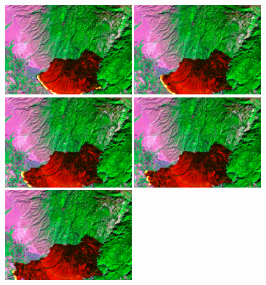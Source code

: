 \documentclass{article}
\begin{document}
    \begin{figure}
        \centering
        \includegraphics[width=0.49\textwidth]{resources/wildfire.overlay.158.png}
        \includegraphics[width=0.49\textwidth]{resources/wildfire.overlay.176.png}\hfill
        \\[\smallskipamount]
        \includegraphics[width=0.49\textwidth]{resources/wildfire.overlay.203.png}\hfill
        \includegraphics[width=0.49\textwidth]{resources/wildfire.overlay.221.png}
        \\[\smallskipamount]
        \includegraphics[width=0.49\textwidth]{resources/wildfire.overlay.236.png}\hfill

\end{figure}
\end{document}
